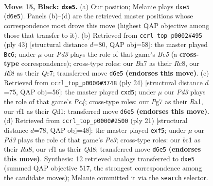 \documentclass[11pt]{article}
\begin{document}
\clearpage

\begin{figure}[p]\centering
\begin{subfigure}{0.46\textwidth}\centering
\resizebox{\linewidth}{!}{%
\newchessgame
\chessboard[
  setfen={r1bq1r2/b1p2ppk/2pp3p/P3N2n/4P3/2PP4/5PP1/RNBQ1RK1 b - - 0 15},
  showmover=false,
  pgfstyle=straightmove, color=movearrow, markmove={d6-e5}
]}
\caption{}
\end{subfigure}\hfill
\begin{subfigure}{0.46\textwidth}\centering
\resizebox{\linewidth}{!}{%
\newchessgame
\chessboard[
  setfen={2r1r1k1/p2nq2p/1p4p1/4pp2/1PP1b3/2Q2NP1/P2R1PBP/3R2K1 b - - 2 22},
  showmover=false,
  pgfstyle=straightmove, color=movearrow, markmove={e4-c6}
]}
\caption{}
\end{subfigure}
\\[4pt]
\begin{subfigure}{0.46\textwidth}\centering
\resizebox{\linewidth}{!}{%
\newchessgame
\chessboard[
  setfen={r1bnqrk1/ppp3pp/3p4/3n1pB1/2PP3P/2P5/P3PP2/R2QKBR1 w Q - 0 13},
  showmover=false,
  pgfstyle=straightmove, color=movearrow, markmove={c4-d5}
]}
\caption{}
\end{subfigure}\hfill
\begin{subfigure}{0.46\textwidth}\centering
\resizebox{\linewidth}{!}{%
\newchessgame
\chessboard[
  setfen={r2qkb1r/1p3ppp/p1n1p3/3pPN2/8/4B3/PPP2PPP/RN1Q1RK1 b kq - 0 11},
  showmover=false,
  pgfstyle=straightmove, color=movearrow, markmove={e6-f5}
]}
\caption{}
\end{subfigure}
\caption{\textbf{Move 15, Black: \texttt{dxe5}.} (a) Our position; Melanie plays \texttt{dxe5} (\texttt{d6e5}). Panels (b)--(d) are the retrieved master positions whose correspondence most drove this move (highest QAP objective among those that transfer to it). (b) Retrieved from \texttt{ccrl\_top\_p0002\#495} (ply 43) [structural distance $d$=80, QAP obj=58]: the master played \texttt{Bc6}; under $\mu$ our \emph{Pd3} plays the role of that game's \emph{Be5} (a \textbf{cross-type} correspondence); cross-type roles: our \emph{B}a7 as their \emph{R}c8, our \emph{R}f8 as their \emph{Q}e7; transferred move \texttt{d6e5} \textbf{(endorses this move)}. (c) Retrieved from \texttt{ccrl\_top\_p0000\#3748} (ply 24) [structural distance $d$=75, QAP obj=56]: the master played \texttt{cxd5}; under $\mu$ our \emph{Pd3} plays the role of that game's \emph{Pc4}; cross-type roles: our \emph{P}g7 as their \emph{R}a1, our \emph{r}f1 as their \emph{Q}d1; transferred move \texttt{d6e5} \textbf{(endorses this move)}. (d) Retrieved from \texttt{ccrl\_top\_p0000\#2500} (ply 21) [structural distance $d$=78, QAP obj=48]: the master played \texttt{exf5}; under $\mu$ our \emph{Pd3} plays the role of that game's \emph{Pe3}; cross-type roles: our \emph{b}c1 as their \emph{R}a8, our \emph{r}f1 as their \emph{Q}d8; transferred move \texttt{d6e5} \textbf{(endorses this move)}. Synthesis: 12 retrieved analogs transferred to \texttt{dxe5} (summed QAP objective 517, the strongest correspondence among the candidate moves); Melanie committed it via the \texttt{search} selector.}
\label{fig:thought-m29}
\end{figure}
\end{document}
